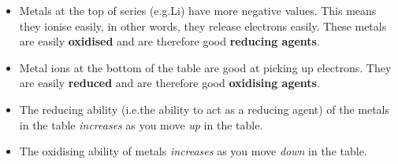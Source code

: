 \begin{itemize}
\item{Metals at the top of series (e.g.\@ Li) have more negative values. This means they ionise easily, in other words, they release electrons easily. These metals are easily \textbf{oxidised} and are therefore good \textbf{reducing agents}.}
\item{Metal ions at the bottom of the table are good at picking up electrons. They are easily \textbf{reduced} and are therefore good \textbf{oxidising agents}.}
\item{The reducing ability (i.e.\@ the ability to act as a reducing agent) of the metals in the table \textit{increases} as you move \textit{up} in the table.}
\item{The oxidising ability of metals \textit{increases} as you move \textit{down} in the table.}
\end{itemize}

